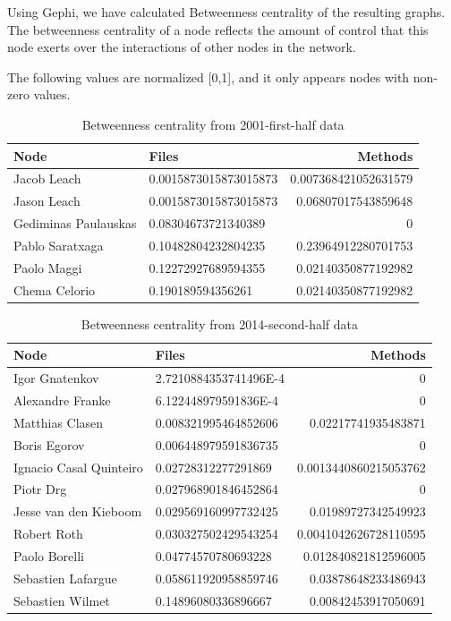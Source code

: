 \documentclass[a4paper]{article}
\begin{document}
Using Gephi, we have calculated Betweenness centrality of the resulting graphs.
The betweenness centrality of a node reflects the amount of control that this
node exerts over the interactions of other nodes in the network.

The following values are normalized [0,1], and it only appears nodes with
non-zero values.

\begin{table}[ht]
\begin{center}
\caption{Betweenness centrality from 2001-first-half data}
\bigskip

\begin{tabular}{|l|l|r|}
\hline
Node & Files & Methods\\ \hline
Jacob Leach & 0.0015873015873015873 & 0.007368421052631579\\
Jason Leach & 0.0015873015873015873 & 0.06807017543859648\\
Gediminas Paulauskas & 0.08304673721340389 & 0\\
Pablo Saratxaga & 0.10482804232804235 & 0.23964912280701753\\
Paolo Maggi & 0.12272927689594355 & 0.02140350877192982\\
Chema Celorio & 0.190189594356261 & 0.02140350877192982\\ \hline
\end{tabular}
\end{center}
\end{table}

\begin{table}[ht]
\begin{center}
\caption{Betweenness centrality from 2014-second-half data}
\bigskip

\begin{tabular}{|l|l|r|}
\hline
Node & Files & Methods\\ \hline
Igor Gnatenkov & 2.7210884353741496E-4 & 0\\
Alexandre Franke & 6.122448979591836E-4 & 0\\
Matthias Clasen & 0.008321995464852606 & 0.02217741935483871\\
Boris Egorov & 0.006448979591836735 & 0\\
Ignacio Casal Quinteiro & 0.02728312277291869 & 0.0013440860215053762\\
Piotr Drg & 0.027968901846452864 & 0\\
Jesse van den Kieboom & 0.029569160997732425 & 0.01989727342549923\\
Robert Roth & 0.030327502429543254 & 0.0041042626728110595\\
Paolo Borelli & 0.04774570780693228 & 0.012840821812596005\\
Sebastien Lafargue & 0.058611920958859746 & 0.03878648233486943\\
Sebastien Wilmet & 0.14896080336896667 & 0.00842453917050691\\ \hline
\end{tabular}
\end{center}
\end{table}
\end{document}
